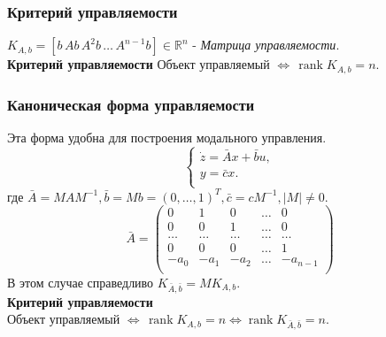 \documentclass[A4]{article}
\begin{document}
\subsubsection{Критерий управляемости}
$K_{A,b}=[b\,Ab\,A^2b\,\ldots\,A^{n-1}b]\in\mathbb{R}^n$ - \emph{Матрица управляемости}.\\
\textbf{Критерий управляемости} Объект управляемый $\Leftrightarrow\,\operatorname{rank}K_{A,b}=n$.
\subsubsection{Каноническая форма управляемости}
Эта форма удобна для построения модального управления.
\begin{equation}
\left\{\begin{array}{cc}
\dot{z}=\bar{A}x+\bar{b}u,\\
y=\bar{c}x.\\
\end{array}\right.
\end{equation}
где $\bar{A}=MAM^{-1},\bar{b}=Mb=(0,\ldots,1)^T,\bar{c}=cM^{-1},|M|\ne0$.
\begin{equation} 
\bar{A}=\left(\begin{array}{ccccc}
0&1&0&\ldots&0\\
0&0&1&\ldots&0\\
\ldots&\ldots&\ldots&\ldots&\ldots\\
0&0&0&\ldots&1\\
-a_0&-a_1&-a_2&\ldots&-a_{n-1}\\
\end{array}\right)
\end{equation}
В этом случае справедливо $K_{\bar{A},\bar{b}}=MK_{A,b}$.\\
\textbf{Критерий управляемости} \\Объект управляемый $\Leftrightarrow\,\operatorname{rank}K_{A,b}=n\Leftrightarrow\operatorname{rank}K_{\bar{A},\bar{b}}=n$.
\end{document}
